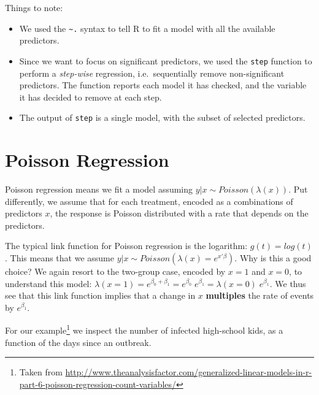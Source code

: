 \documentclass[]{book}
\providecommand{\tightlist}{%
  \setlength{\itemsep}{0pt}\setlength{\parskip}{0pt}}
\theoremstyle{definition}
\theoremstyle{definition}
\theoremstyle{definition}
\theoremstyle{remark}
\begin{document}
Things to note:

\begin{itemize}
\tightlist
\item
  We used the \texttt{\textasciitilde{}.} syntax to tell R to fit a model with all the available predictors.
\item
  Since we want to focus on significant predictors, we used the \texttt{step} function to perform a \emph{step-wise} regression, i.e.~sequentially remove non-significant predictors.
  The function reports each model it has checked, and the variable it has decided to remove at each step.
\item
  The output of \texttt{step} is a single model, with the subset of selected predictors.
\end{itemize}

\hypertarget{poisson-regression}{%
\section{Poisson Regression}\label{poisson-regression}}

Poisson regression means we fit a model assuming \(y|x \sim Poisson(\lambda(x))\).
Put differently, we assume that for each treatment, encoded as a combinations of predictors \(x\), the response is Poisson distributed with a rate that depends on the predictors.

The typical link function for Poisson regression is the logarithm: \(g(t)=log(t)\).
This means that we assume \(y|x \sim Poisson(\lambda(x) = e^{x'\beta})\).
Why is this a good choice?
We again resort to the two-group case, encoded by \(x=1\) and \(x=0\), to understand this model:
\(\lambda(x=1)=e^{\beta_0+\beta_1}=e^{\beta_0} \; e^{\beta_1}= \lambda(x=0) \; e^{\beta_1}\).
We thus see that this link function implies that a change in \(x\) \textbf{multiples} the rate of events by \(e^{\beta_1}\).

For our example\footnote{Taken from \url{http://www.theanalysisfactor.com/generalized-linear-models-in-r-part-6-poisson-regression-count-variables/}} we inspect the number of infected high-school kids, as a function of the days since an outbreak.
\end{document}
